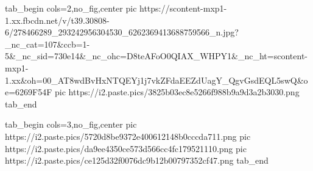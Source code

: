  
 
 
 
 

\ifcmt
  tab_begin cols=2,no_fig,center
     pic https://scontent-mxp1-1.xx.fbcdn.net/v/t39.30808-6/278466289_293242956304530_6262369413688759566_n.jpg?_nc_cat=107&ccb=1-5&_nc_sid=730e14&_nc_ohc=D8teAFoO0QIAX_WHPY1&_nc_ht=scontent-mxp1-1.xx&oh=00_AT8wdBvHxNTQEYj1j7vkZFdaEEZdUagY_QgvGsdEQL5swQ&oe=6269F54F
		 pic https://i2.paste.pics/3825b03ec8e5266f988b9a9d3a2b3030.png
  tab_end
\fi

\ifcmt
  tab_begin cols=3,no_fig,center
		 pic https://i2.paste.pics/5720d8be9372e400612148b0cccda711.png
		 pic https://i2.paste.pics/da9ee4350ce573d566cc4fc179521110.png
		 pic https://i2.paste.pics/ce125d32f0076dc9b12b00797352cf47.png
  tab_end
\fi

